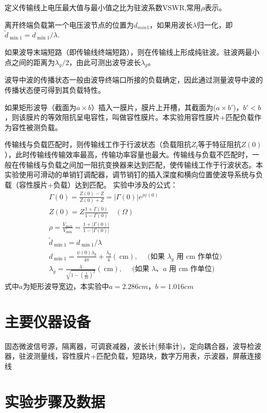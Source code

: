 \documentclass{../source/zjureport}
\begin{document}
定义传输线上电压最大值与最小值之比为驻波系数VSWR,常用$\rho$表示。

离开终端负载第一个电压波节点的位置为$d_{min1}$，如果用波长$\lambda$归一化，即$\tilde{d}_{\min 1}=d_{\min 1} / \lambda$.

如果波导末端短路（即传输线终端短路），则在传输线上形成纯驻波。驻波两最小点之间的距离为$\lambda_g/2$，由此可测出波导波长$\lambda_g$。

波导中波的传播状态一般由波导终端口所接的负载确定，因此通过测量波导中波的传播状态便可得到其负载特性。

如果矩形波导（截面为$a\times b$）插入一膜片，膜片上开槽，其截面为($a\times b'$)，$b'< b$，则该膜片的等效阻抗呈电容性，叫做容性膜片。本实验用容性膜片+匹配负载作为容性被测负载。

传输线与负载匹配时，则传输线工作于行波状态（负载阻抗$Z_l$等于特征阻抗$Z(0)$），此时传输线传输效率最高，传输功率容量也最大。传输线与负载不匹配时，一般在传输线与负载之间加一阻抗变换器来达到匹配，使传输线工作于行波状态。本实验使用可滑动的单销钉调配器，调节销钉的插入深度和横向位置使波导系统与负载（容性膜片+负载）达到匹配。
实验中涉及的公式：
$$
\begin{aligned}
&\Gamma(0)=\displaystyle \frac{Z(0)-Z}{Z(0)+Z}=|\Gamma(0)| e^{j \psi(0)} \\
&Z(0)=Z \displaystyle \frac{1+\Gamma(0)}{1-\Gamma(0)} \quad(\Omega) \\
&\rho=\displaystyle \frac{V_{\max }}{V_{\min }}=\displaystyle \frac{1+|\Gamma(0)|}{1-|\Gamma(0)|} \\
&\tilde{d}_{\min 1}=d_{\min 1} / \lambda \\
&d_{\min 1}=\displaystyle \frac{\psi(0) \lambda_{g}}{4 \pi}+\displaystyle \frac{\lambda_{g}}{4}(\mathrm{~cm}), \quad \text { (如果 } \lambda_{g} \text { 用 } \mathrm{cm} \text { 作单位) } \\
&\lambda_{g}=\displaystyle \frac{\lambda}{\sqrt{1-\left(\displaystyle \frac{\lambda}{2 a}\right)^{2}}}(\mathrm{~cm}), \quad \text { (如果 } \lambda 、 a \text { 用 } \mathrm{cm} \text { 作单位) }
\end{aligned}
$$
式中$a$为矩形波导宽边，本实验中$a =2.286 cm，b=1.016cm$

    \section{主要仪器设备}
    固态微波信号源，隔离器，可调衰减器，波长计(频率计)，定向耦合器，波导检波器，驻波测量线，容性膜片+匹配负载，短路块，数字万用表，示波器，屏蔽连接线
    \section{实验步骤及数据}
\end{document}
